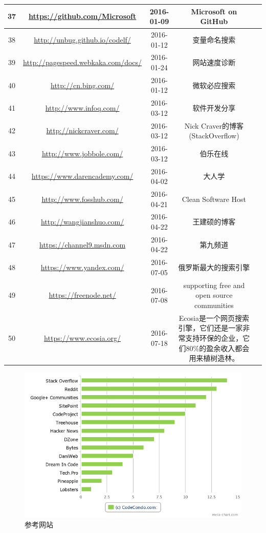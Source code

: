 \documentclass{book}
\begin{document}
\begin{longtable}{|c|c|c|c|c|}
	37 & \url{https://github.com/Microsoft} & 2016-01-09 & Microsoft on GitHub\\
	\hline
	38 & \url{http://unbug.github.io/codelf/} & 2016-01-12 & 变量命名搜索\\
	\hline
	39 & \url{http://pagespeed.webkaka.com/docs/} & 2016-01-24 & 网站速度诊断 \\
	\hline
	40 & \url{http://cn.bing.com/} & 2016-01-12 & 微软必应搜索\\
	\hline
	41 & \url{http://www.infoq.com/} & 2016-03-12 & 软件开发分享\\
	\hline
	42 & \url{http://nickcraver.com/} & 2016-03-12 & Nick Craver的博客(StackOverflow)\\
	\hline
	43 & \url{http://www.jobbole.com/} & 2016-03-12 & 伯乐在线\\
	\hline
	44 & \url{https://www.darencademy.com/} & 2016-04-02 & 大人学\\
	\hline
	45 & \url{http://www.fosshub.com/} & 2016-04-21 & Clean Software Host\\
	\hline
	46 & \url{http://wangjianshuo.com/}	& 2016-04-22 & 王建硕的博客\\
	\hline
	47 & \url{https://channel9.msdn.com} & 2016-04-22 & 第九频道\\
	\hline
	48 & \url{https://www.yandex.com/} & 2016-07-05 & 俄罗斯最大的搜索引擎\\
	\hline
	49 & \url{https://freenode.net/} & 2016-07-08 & supporting free and open source communities\\
	50 & \url{https://www.ecosia.org/}	& 2016-07-18 & Ecosia是一个网页搜索引擎，它们还是一家非常支持环保的企业，它们80\%的盈余收入都会用来植树造林。 \\
	\hline
\end{longtable}


\begin{figure}[htbp]
	\centering
	\includegraphics[scale=0.8]{14-communities-programmers-go.png}
	\caption{参考网站}
	\label{DeobfuscationedDll}
\end{figure}
\end{document}
